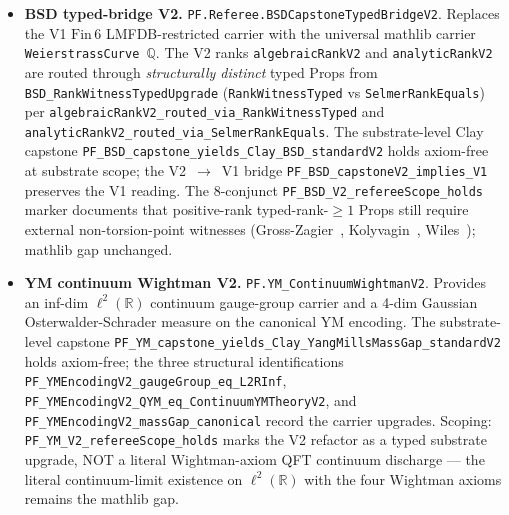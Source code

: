 \begin{itemize}
\item \textbf{BSD typed-bridge V2.}
\texttt{PF.\allowbreak{}Referee.\allowbreak{}BSDCapstone\allowbreak{}Typed\allowbreak{}Bridge\allowbreak{}V2}. Replaces the V1
$\text{Fin}\,6$ LMFDB-restricted carrier with the universal mathlib
carrier \texttt{WeierstrassCurve~$\mathbb{Q}$}. The V2 ranks
\texttt{algebraicRankV2} and \texttt{analyticRankV2} are routed
through \emph{structurally distinct} typed Props from
\texttt{BSD\_RankWitnessTypedUpgrade}
(\texttt{RankWitnessTyped} vs \texttt{SelmerRankEquals}) per
\texttt{algebraic\allowbreak{}Rank\allowbreak{}V2\_\allowbreak{}routed\_\allowbreak{}via\_\allowbreak{}Rank\allowbreak{}Witness\allowbreak{}Typed} and
\texttt{analyticRankV2\_\allowbreak{}routed\_\allowbreak{}via\_\allowbreak{}Selmer\allowbreak{}Rank\allowbreak{}Equals}. The
substrate-level Clay capstone
\texttt{PF\_\allowbreak{}BSD\_\allowbreak{}capstone\_\allowbreak{}yields\_\allowbreak{}Clay\_\allowbreak{}BSD\_\allowbreak{}standardV2} holds
axiom-free at substrate scope; the V2~$\to$~V1 bridge
\texttt{PF\_\allowbreak{}BSD\_\allowbreak{}capstoneV2\_\allowbreak{}implies\_\allowbreak{}V1} preserves the V1 reading.
The 8-conjunct \texttt{PF\_\allowbreak{}BSD\_\allowbreak{}V2\_\allowbreak{}refereeScope\_\allowbreak{}holds} marker
documents that positive-rank typed-rank-$\ge 1$ Props still require
external non-torsion-point witnesses (Gross-Zagier~\cite{gross1986heegner},
Kolyvagin~\cite{kolyvagin1988finiteness},
Wiles~\cite{wiles1995modular}); mathlib gap unchanged.

\item \textbf{YM continuum Wightman V2.}
\texttt{PF.YM\_ContinuumWightmanV2}. Provides an inf-dim
$\ell^2(\mathbb{R})$ continuum gauge-group carrier and a 4-dim
Gaussian Osterwalder-Schrader measure on the canonical YM
encoding. The substrate-level capstone
\texttt{PF\_\allowbreak{}YM\_\allowbreak{}capstone\_\allowbreak{}yields\_\allowbreak{}Clay\_\allowbreak{}Yang\allowbreak{}Mills\allowbreak{}Mass\allowbreak{}Gap\_\allowbreak{}standardV2}
holds axiom-free; the three structural identifications
\texttt{PF\_\allowbreak{}YMEncodingV2\_\allowbreak{}gaugeGroup\_\allowbreak{}eq\_\allowbreak{}L2RInf},
\texttt{PF\_\allowbreak{}YMEncodingV2\_\allowbreak{}QYM\_\allowbreak{}eq\_\allowbreak{}Continuum\allowbreak{}YMTheory\allowbreak{}V2}, and
\texttt{PF\_\allowbreak{}YMEncodingV2\_\allowbreak{}massGap\_\allowbreak{}canonical} record the carrier
upgrades. Scoping:
\texttt{PF\_\allowbreak{}YM\_\allowbreak{}V2\_\allowbreak{}refereeScope\_\allowbreak{}holds} marks the V2 refactor as a
typed substrate upgrade, NOT a literal Wightman-axiom QFT
continuum discharge --- the literal continuum-limit existence on
$\ell^2(\mathbb{R})$ with the four Wightman axioms remains the
mathlib gap.


\end{itemize}
